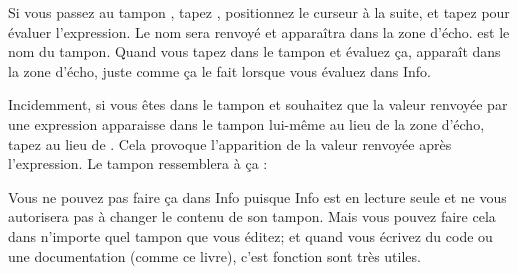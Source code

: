Si vous passez au tampon , tapez ,
positionnez le curseur à la suite, et tapez  pour évaluer
l'expression. Le nom  sera renvoyé et apparaîtra
dans la zone d'écho.  est le nom du tampon. Quand
vous tapez  dans le tampon  et
évaluez ça,  apparaît dans la zone d'écho, juste comme ça le
fait lorsque vous évaluez  dans Info.

Incidemment, si vous êtes dans le tampon  et souhaitez
que la valeur renvoyée par une expression apparaisse dans le tampon
 lui-même au lieu de la zone d'écho, tapez  au lieu de . Cela provoque l'apparition de la
valeur renvoyée après l'expression. Le tampon ressemblera à ça :


Vous ne pouvez pas faire ça dans Info puisque Info est en lecture
seule et ne vous autorisera pas à changer le contenu de son
tampon. Mais vous pouvez faire cela dans n'importe quel tampon que
vous éditez; et quand vous écrivez du code ou une documentation (comme
ce livre), c'est fonction sont très utiles.

